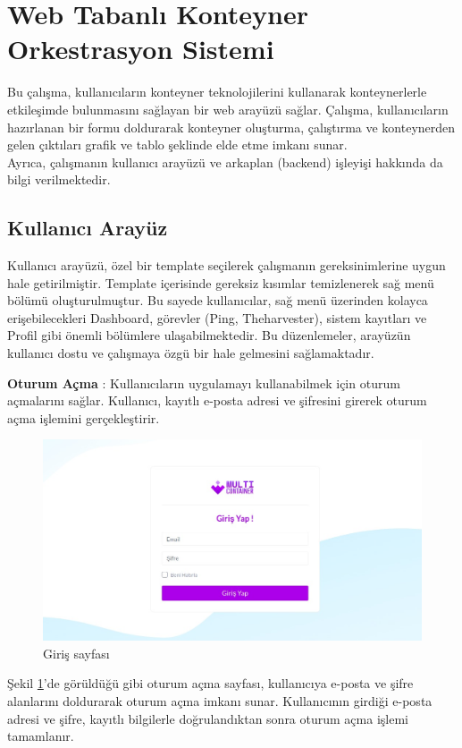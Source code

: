 \section{Web Tabanlı Konteyner Orkestrasyon Sistemi}\label{sec:study}
Bu çalışma, kullanıcıların konteyner teknolojilerini kullanarak konteynerlerle etkileşimde bulunmasını sağlayan bir web arayüzü sağlar. Çalışma, kullanıcıların hazırlanan bir formu doldurarak konteyner oluşturma, çalıştırma ve konteynerden gelen çıktıları grafik ve tablo şeklinde elde etme imkanı sunar.\\
Ayrıca, çalışmanın kullanıcı arayüzü ve arkaplan (backend) işleyişi hakkında da bilgi verilmektedir.
\subsection{Kullanıcı Arayüz}
Kullanıcı arayüzü, özel bir template seçilerek çalışmanın gereksinimlerine uygun hale getirilmiştir. Template içerisinde gereksiz kısımlar temizlenerek sağ menü bölümü oluşturulmuştur. Bu sayede kullanıcılar, sağ menü üzerinden kolayca erişebilecekleri Dashboard, görevler (Ping, Theharvester), sistem kayıtları ve Profil gibi önemli bölümlere ulaşabilmektedir. Bu düzenlemeler, arayüzün kullanıcı dostu ve çalışmaya özgü bir hale gelmesini sağlamaktadır.

\textbf{Oturum Açma} : Kullanıcıların uygulamayı kullanabilmek için oturum açmalarını sağlar. Kullanıcı, kayıtlı e-posta adresi ve şifresini girerek oturum açma işlemini gerçekleştirir.
\begin{figure}[ht]
	\centering
	\includegraphics[width=0.9\linewidth]{images/login.jpeg}
	\caption{Giriş sayfası}
	\label{fig:login}
\end{figure}

Şekil \ref{fig:login}'de görüldüğü gibi oturum açma sayfası, kullanıcıya e-posta ve şifre alanlarını doldurarak oturum açma imkanı sunar. Kullanıcının girdiği e-posta adresi ve şifre, kayıtlı bilgilerle doğrulandıktan sonra oturum açma işlemi tamamlanır.

